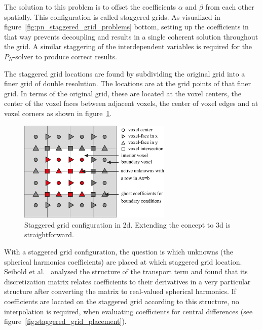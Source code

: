 The solution to this problem is to offset the coefficients $\alpha$ and $\beta$ from each other spatially. This configuration is called staggered grids. As visualized in figure~\ref{fig:pn_staggered_grid_problems} bottom, setting up the coefficients in that way prevents decoupling and results in a single coherent solution throughout the grid. A similar staggering of the interdependent variables is required for the $P_N$-solver to produce correct results.

The staggered grid locations are found by subdividing the original grid into a finer grid of double resolution. The locations are at the grid points of that finer grid. In terms of the original grid, these are located at the voxel centers, the center of the voxel faces between adjacent voxels, the center of voxel edges and at voxel corners as shown in figure~\ref{fig:staggered_grid}.
\begin{figure}[h]
\centering
\includegraphics[width=0.65\textwidth]{04_pn_method/figures/fig_staggered_grid.pdf}
\caption{Staggered grid configuration in 2d. Extending the concept to 3d is straightforward.}
\label{fig:staggered_grid}
\end{figure}

With a staggered grid configuration, the question is which unknowns (the spherical harmonics coefficients) are placed at which staggered grid location. Seibold et al.~\cite{Seibold14} analysed the structure of the transport term and found that its discretization matrix relates coefficients to their derivatives in a very particular structure after converting the matrix to real-valued spherical harmonics. If coefficients are located on the staggered grid according to this structure, no interpolation is required, when evaluating coefficients for central differences (see figure~\ref{fig:staggered_grid_placement}).

